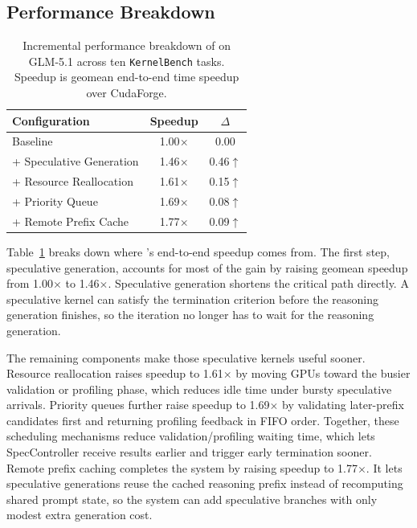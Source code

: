 \subsection{Performance Breakdown}\label{subsec:eval_performance_breakdown}

\begin{table}[t]
    \centering
    \caption{Incremental performance breakdown of \sysname{} on GLM-5.1 across ten \texttt{KernelBench} tasks. Speedup is geomean end-to-end time speedup over CudaForge.}
    \vspace{-10pt}
    \label{tab:ablation_study}
    \renewcommand{\arraystretch}{0.9}
    \begin{tabular}{lcc}
        \toprule
        Configuration & Speedup & $\Delta$ \\
        \midrule
        Baseline & 1.00$\times$ & 0.00 \\
        + Speculative Generation & 1.46$\times$ & 0.46$\uparrow$ \\
        + Resource Reallocation & 1.61$\times$ & 0.15$\uparrow$ \\
        + Priority Queue & 1.69$\times$ & 0.08$\uparrow$ \\
        + Remote Prefix Cache & 1.77$\times$ & 0.09$\uparrow$ \\
        \bottomrule
    \end{tabular}
    \vspace{-15pt}
\end{table}
Table~\ref{tab:ablation_study} breaks down where \sysname{}'s end-to-end
speedup comes from.
The first step, speculative generation, accounts for most of the gain by raising
geomean speedup from 1.00$\times$ to 1.46$\times$.
Speculative generation shortens the critical path directly. A speculative
kernel can satisfy the termination criterion before the reasoning generation
finishes, so the iteration no longer has to wait for the reasoning generation.

The remaining components make those speculative kernels useful sooner.
Resource reallocation raises speedup to 1.61$\times$ by moving GPUs toward the
busier validation or profiling phase, which reduces idle time under bursty
speculative arrivals.
Priority queues further raise speedup to 1.69$\times$ by validating later-prefix
candidates first and returning profiling feedback in FIFO order.
Together, these scheduling mechanisms reduce validation/profiling waiting time,
which lets SpecController receive results earlier and trigger early termination
sooner.
Remote prefix caching completes the system by raising speedup to 1.77$\times$.
It lets speculative generations reuse the cached reasoning prefix instead of
recomputing shared prompt state, so the system can add speculative branches with
only modest extra generation cost.


